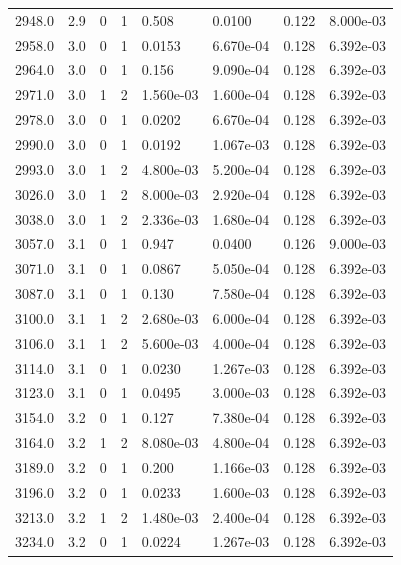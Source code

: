 \documentclass[preview]{standalone}
\begin{document}
{{{{\begin{tabular}{L{1.2cm}C{1.2cm} C{0.3cm}C{0.5cm} C{1.4cm}C{1.4cm} C{1.4cm}C{1.4cm}}
  2948.0  &   2.9  & 0     &  1 &  0.508  & 0.0100  & 0.122 &  8.000e-03   \\ 
  2958.0  &   3.0  & 0     &  1 &  0.0153  & 6.670e-04  & 0.128 &  6.392e-03   \\ 
  2964.0  &   3.0  & 0     &  1 &  0.156  & 9.090e-04  & 0.128 &  6.392e-03   \\ 
  2971.0  &   3.0  & 1     &  2 &  1.560e-03  & 1.600e-04  & 0.128 &  6.392e-03   \\ 
  2978.0  &   3.0  & 0     &  1 &  0.0202  & 6.670e-04  & 0.128 &  6.392e-03   \\ 
  2990.0  &   3.0  & 0     &  1 &  0.0192  & 1.067e-03  & 0.128 &  6.392e-03   \\ 
  2993.0  &   3.0  & 1     &  2 &  4.800e-03  & 5.200e-04  & 0.128 &  6.392e-03   \\ 
  3026.0  &   3.0  & 1     &  2 &  8.000e-03  & 2.920e-04  & 0.128 &  6.392e-03   \\ 
  3038.0  &   3.0  & 1     &  2 &  2.336e-03  & 1.680e-04  & 0.128 &  6.392e-03   \\ 
  3057.0  &   3.1  & 0     &  1 &  0.947  & 0.0400  & 0.126 &  9.000e-03   \\ 
  3071.0  &   3.1  & 0     &  1 &  0.0867  & 5.050e-04  & 0.128 &  6.392e-03   \\ 
  3087.0  &   3.1  & 0     &  1 &  0.130  & 7.580e-04  & 0.128 &  6.392e-03   \\ 
  3100.0  &   3.1  & 1     &  2 &  2.680e-03  & 6.000e-04  & 0.128 &  6.392e-03   \\ 
  3106.0  &   3.1  & 1     &  2 &  5.600e-03  & 4.000e-04  & 0.128 &  6.392e-03   \\ 
  3114.0  &   3.1  & 0     &  1 &  0.0230  & 1.267e-03  & 0.128 &  6.392e-03   \\ 
  3123.0  &   3.1  & 0     &  1 &  0.0495  & 3.000e-03  & 0.128 &  6.392e-03   \\ 
  3154.0  &   3.2  & 0     &  1 &  0.127  & 7.380e-04  & 0.128 &  6.392e-03   \\ 
  3164.0  &   3.2  & 1     &  2 &  8.080e-03  & 4.800e-04  & 0.128 &  6.392e-03   \\ 
  3189.0  &   3.2  & 0     &  1 &  0.200  & 1.166e-03  & 0.128 &  6.392e-03   \\ 
  3196.0  &   3.2  & 0     &  1 &  0.0233  & 1.600e-03  & 0.128 &  6.392e-03   \\ 
  3213.0  &   3.2  & 1     &  2 &  1.480e-03  & 2.400e-04  & 0.128 &  6.392e-03   \\ 
  3234.0  &   3.2  & 0     &  1 &  0.0224  & 1.267e-03  & 0.128 &  6.392e-03   \\ 

\end{tabular}}}}}
\end{document}
